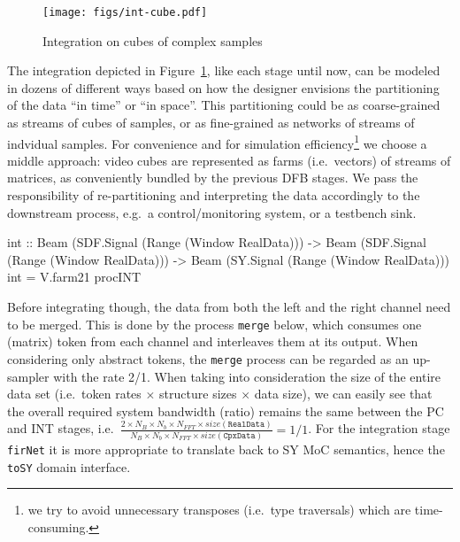 \documentclass[
  a4paper,
]{article}
\newenvironment{Shaded}{}{}
\newcommand{\DataTypeTok}[1]{\textcolor[rgb]{0.56,0.13,0.00}{#1}}
\newcommand{\FunctionTok}[1]{\textcolor[rgb]{0.02,0.16,0.49}{#1}}
\newcommand{\NormalTok}[1]{#1}
\newcommand{\OtherTok}[1]{\textcolor[rgb]{0.00,0.44,0.13}{#1}}
\begin{document}
\begin{figure}
\hypertarget{fig:int-cube-atom}{%
\centering
\texttt{[image: figs/int-cube.pdf]}
\caption{Integration on cubes of complex
samples}\label{fig:int-cube-atom}
}
\end{figure}

The integration depicted in Figure~\ref{fig:int-cube-atom}, like each
stage until now, can be modeled in dozens of different ways based on how
the designer envisions the partitioning of the data ``in time'' or ``in
space''. This partitioning could be as coarse-grained as streams of
cubes of samples, or as fine-grained as networks of streams of indvidual
samples. For convenience and for simulation efficiency\footnote{we try
  to avoid unnecessary transposes (i.e.~type traversals) which are
  time-consuming.} we choose a middle approach: video cubes are
represented as farms (i.e.~vectors) of streams of matrices, as
conveniently bundled by the previous DFB stages. We pass the
responsibility of re-partitioning and interpreting the data accordingly
to the downstream process, e.g.~a control/monitoring system, or a
testbench sink.

\begin{Shaded}
\begin{Highlighting}[numbers=left,,firstnumber=572,]
\OtherTok{int ::} \DataTypeTok{Beam}\NormalTok{ (}\DataTypeTok{SDF.Signal}\NormalTok{ (}\DataTypeTok{Range}\NormalTok{ (}\DataTypeTok{Window} \DataTypeTok{RealData}\NormalTok{)))}
    \OtherTok{->} \DataTypeTok{Beam}\NormalTok{ (}\DataTypeTok{SDF.Signal}\NormalTok{ (}\DataTypeTok{Range}\NormalTok{ (}\DataTypeTok{Window} \DataTypeTok{RealData}\NormalTok{)))}
    \OtherTok{->} \DataTypeTok{Beam}\NormalTok{ (}\DataTypeTok{SY.Signal}\NormalTok{  (}\DataTypeTok{Range}\NormalTok{ (}\DataTypeTok{Window} \DataTypeTok{RealData}\NormalTok{)))}
\NormalTok{int }\FunctionTok{=}\NormalTok{ V.farm21 procINT}
\end{Highlighting}
\end{Shaded}

Before integrating though, the data from both the left and the right
channel need to be merged. This is done by the process \texttt{merge}
below, which consumes one (matrix) token from each channel and
interleaves them at its output. When considering only abstract tokens,
the \texttt{merge} process can be regarded as an up-sampler with the
rate 2/1. When taking into consideration the size of the entire data set
(i.e.~token rates \(\times\) structure sizes \(\times\) data size), we
can easily see that the overall required system bandwidth (ratio)
remains the same between the PC and INT stages,
i.e.~\(\frac{2\times N_B \times N_{b} \times N_{FFT}\times \mathit{size}(\mathtt{RealData})}{N_B \times N_{b} \times N_{FFT}\times \mathit{size}(\mathtt{CpxData})}=1/1\).
For the integration stage \texttt{firNet} it is more appropriate to
translate back to SY MoC semantics, hence the \texttt{toSY} domain
interface.
\end{document}
